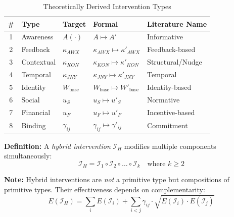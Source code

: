 \begin{table}[htbp]
\centering
\caption{Theoretically Derived Intervention Types}
\label{tab:hhh-types-derived}
\renewcommand{\arraystretch}{1.3}
\begin{tabular}{@{}clllp{3.5cm}@{}}
\toprule
\textbf{\#} & \textbf{Type} & \textbf{Target} & \textbf{Formal} & \textbf{Literature Name} \\
\midrule
1 & Awareness & $A(\cdot)$ & $A \mapsto A'$ & Informative \\
2 & Feedback & $\kappa_{AWX}$ & $\kappa_{AWX} \mapsto \kappa'_{AWX}$ & Feedback-based \\
3 & Contextual & $\kappa_{KON}$ & $\kappa_{KON} \mapsto \kappa'_{KON}$ & Structural/Nudge \\
4 & Temporal & $\kappa_{JNY}$ & $\kappa_{JNY} \mapsto \kappa'_{JNY}$ & Temporal \\
5 & Identity & $W_{\text{base}}$ & $W_{\text{base}} \mapsto W'_{\text{base}}$ & Identity-based \\
6 & Social & $u_S$ & $u_S \mapsto u'_S$ & Normative \\
7 & Financial & $u_F$ & $u_F \mapsto u'_F$ & Incentive-based \\
8 & Binding & $\gamma_{ij}$ & $\gamma_{ij} \mapsto \gamma'_{ij}$ & Commitment \\
\bottomrule
\end{tabular}
\end{table}

\begin{tcolorbox}[colback=gray!5!white, colframe=gray!75!black,
    title=Definition HHH-D1: Hybrid Interventions]
\textbf{Definition:} A \textit{hybrid intervention} $\mathcal{I}_H$ modifies multiple components simultaneously:
\begin{equation}
\mathcal{I}_H = \mathcal{I}_1 \circ \mathcal{I}_2 \circ \ldots \circ \mathcal{I}_k \quad \text{where } k \geq 2
\end{equation}

\textbf{Note:} Hybrid interventions are \textit{not} a primitive type but compositions of primitive types. Their effectiveness depends on complementarity:
\begin{equation}
E(\mathcal{I}_H) = \sum_{i} E(\mathcal{I}_i) + \sum_{i < j} \gamma_{ij} \cdot \sqrt{E(\mathcal{I}_i) \cdot E(\mathcal{I}_j)}
\end{equation}
\end{tcolorbox}

